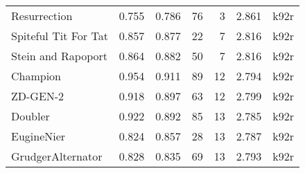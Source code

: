 \begin{tabular}{lrrrrrl}
Resurrection                &                               0.755 &                            0.786 &            76 &     3 &  2.861 &   k92r \\
Spiteful Tit For Tat        &                               0.857 &                            0.877 &            22 &     7 &  2.816 &   k92r \\
Stein and Rapoport          &                               0.864 &                            0.882 &            50 &     7 &  2.816 &   k92r \\
Champion                    &                               0.954 &                            0.911 &            89 &    12 &  2.794 &   k92r \\
ZD-GEN-2                    &                               0.918 &                            0.897 &            63 &    12 &  2.799 &   k92r \\
Doubler                     &                               0.922 &                            0.892 &            85 &    13 &  2.785 &   k92r \\
EugineNier                  &                               0.824 &                            0.857 &            28 &    13 &  2.787 &   k92r \\
GrudgerAlternator           &                               0.828 &                            0.835 &            69 &    13 &  2.793 &   k92r \\
\bottomrule
\end{tabular}
